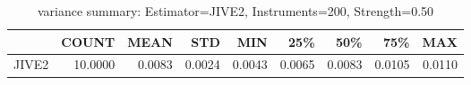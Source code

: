 \begin{table}[ht]
\centering
\caption{variance summary: Estimator=JIVE2, Instruments=200, Strength=0.50}
\begin{tabular}{lrrrrrrrr}
\toprule
 & COUNT & MEAN & STD & MIN & 25\% & 50\% & 75\% & MAX \\
\midrule
JIVE2 & 10.0000 & 0.0083 & 0.0024 & 0.0043 & 0.0065 & 0.0083 & 0.0105 & 0.0110 \\
\bottomrule
\end{tabular}
\end{table}
